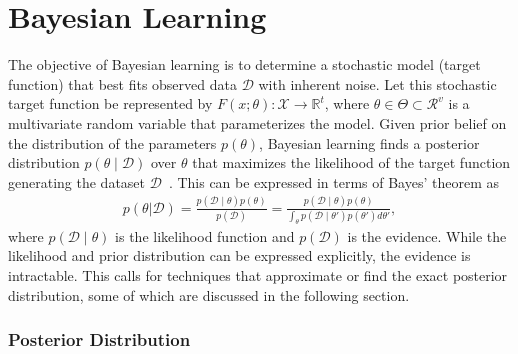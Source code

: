 \section{Bayesian Learning}

The objective of Bayesian learning is to determine a stochastic model (target
function) that best fits observed data $\mathcal{D}$ with inherent noise. Let
this stochastic target function be represented by $F(x; \theta) : \mathcal{X}
\rightarrow \mathbb{R}^t$, where $\theta \in \Theta \subset \mathcal{R}^v$ is a
multivariate random variable that parameterizes the model. Given prior belief on
the distribution of the parameters $p(\theta)$, Bayesian learning finds a
posterior distribution $p(\theta \mid \mathcal{D})$ over $\theta$ that maximizes
the likelihood of the target function generating the dataset
$\mathcal{D}$~\cite{bishop2006pattern}. This can be expressed in terms of Bayes'
theorem as 
\begin{align}
  p(\theta | \mathcal{D}) = \frac{p(\mathcal{D} \mid \theta) p(\theta)}{p(\mathcal{D})}
  = \frac{p(\mathcal{D} \mid \theta) p(\theta)}{\int_\theta p(\mathcal{D} \mid \theta') p(\theta') d\theta'},
\end{align}
where $p(\mathcal{D} \mid \theta)$ is the likelihood function and
$p(\mathcal{D})$ is the evidence. While the likelihood and prior distribution
can be expressed explicitly, the evidence is intractable. This calls for
techniques that approximate or find the exact posterior distribution, some of
which are discussed in the following section.

\subsubsection{Posterior Distribution}

